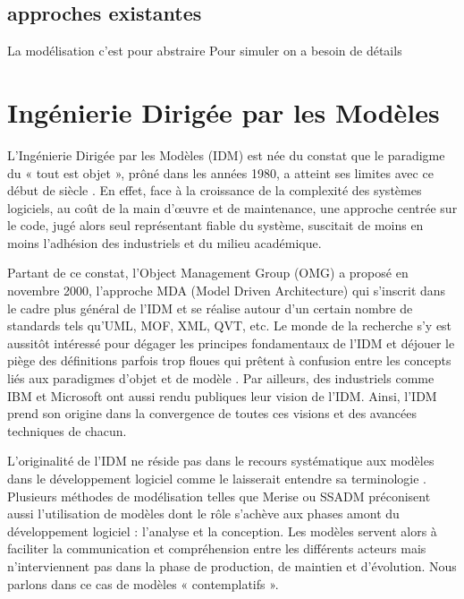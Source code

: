 \subsection{approches existantes}

La modélisation c'est pour abstraire
Pour simuler on a besoin de détails



\section{Ingénierie Dirigée par les Modèles}

L'Ingénierie Dirigée par les Modèles (IDM) est née du constat que le paradigme 
du « tout est objet », prôné dans les années 1980, a atteint ses limites avec ce 
début de siècle \cite{greenfield2004software}. En effet, face à la croissance de 
la complexité des systèmes logiciels, au coût de la main d'œuvre et de 
maintenance, une approche centrée sur le code, jugé alors seul représentant 
fiable du système, suscitait de moins en moins l'adhésion des industriels et du 
milieu académique. 

Partant de ce constat, l'Object Management Group (OMG) a proposé en novembre 
2000, l'approche MDA (Model Driven Architecture) qui s'inscrit dans le cadre 
plus général de l'IDM et se réalise autour d'un certain nombre de standards tels 
qu'UML, MOF, XML, QVT, etc. Le monde de la recherche s'y est aussitôt intéressé 
pour dégager les principes fondamentaux de l'IDM 
\cite{bezivin2001towards}\cite{kent2002model} \cite{de2002using} et déjouer le 
piège des définitions parfois trop floues qui prêtent à confusion entre les 
concepts liés aux paradigmes d'objet et de modèle \cite{bezivin2004search}. Par 
ailleurs, des industriels comme IBM \cite{booch2004mda} et Microsoft 
\cite{greenfield2004software} ont aussi rendu publiques leur vision de l'IDM. 
Ainsi, l'IDM prend son origine dans la convergence de toutes ces visions et des 
avancées techniques de chacun.

L'originalité de l'IDM ne réside pas dans le recours systématique aux modèles 
dans le développement logiciel comme le laisserait entendre sa terminologie  
\cite{bezivin2004rapport}. Plusieurs méthodes de modélisation telles que Merise 
ou SSADM préconisent aussi l'utilisation de modèles dont le rôle s'achève aux 
phases amont du développement logiciel : l'analyse et la conception. Les modèles 
servent alors à faciliter la communication et compréhension entre les différents 
acteurs mais n'interviennent pas dans la phase de production, de maintien et 
d'évolution. Nous parlons dans ce cas de modèles « contemplatifs ». 

